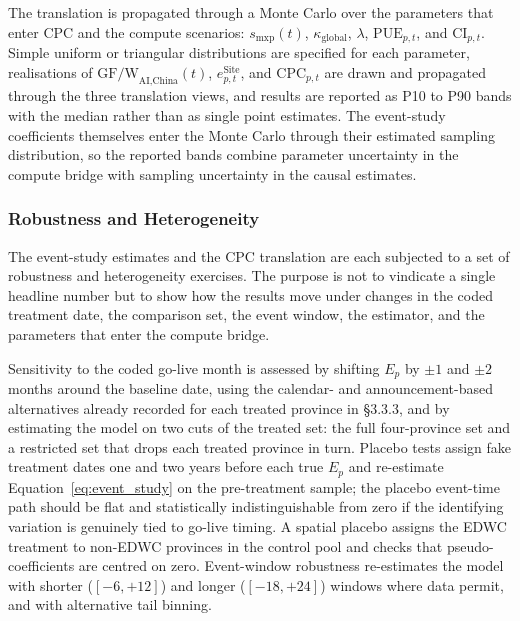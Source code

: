 \documentclass[12pt,a4paper]{article}
\begin{document}
The translation is propagated through a Monte Carlo over the
parameters that enter CPC and the compute scenarios:
$s_{\text{mxp}}(t)$, $\kappa_{\text{global}}$, $\lambda$,
$\text{PUE}_{p,t}$, and $\text{CI}_{p,t}$. Simple uniform or
triangular distributions are specified for each parameter,
realisations of $\text{GF/W}_{\text{AI,China}}(t)$,
$e^{\text{Site}}_{p,t}$, and $\text{CPC}_{p,t}$ are drawn and
propagated through the three translation views, and results are
reported as P10 to P90 bands with the median rather than as single
point estimates. The event-study coefficients themselves enter the
Monte Carlo through their estimated sampling distribution, so the
reported bands combine parameter uncertainty in the compute bridge
with sampling uncertainty in the causal estimates.

\subsubsection{Robustness and Heterogeneity}
%
%

The event-study estimates and the CPC translation are each subjected
to a set of robustness and heterogeneity exercises. The purpose is not
to vindicate a single headline number but to show how the results move
under changes in the coded treatment date, the comparison set, the
event window, the estimator, and the parameters that enter the
compute bridge.

Sensitivity to the coded go-live month is assessed by shifting $E_p$
by $\pm 1$ and $\pm 2$ months around the baseline date, using the
calendar- and announcement-based alternatives already recorded for
each treated province in §3.3.3, and by estimating the model on two
cuts of the treated set: the full four-province set and a restricted
set that drops each treated province in turn. Placebo tests assign
fake treatment dates one and two years before each true $E_p$ and
re-estimate Equation~\eqref{eq:event_study} on the pre-treatment
sample; the placebo event-time path should be flat and statistically
indistinguishable from zero if the identifying variation is genuinely
tied to go-live timing. A spatial placebo assigns the EDWC treatment
to non-EDWC provinces in the control pool and checks that
pseudo-coefficients are centred on zero. Event-window robustness
re-estimates the model with shorter ($[-6, +12]$) and longer
($[-18, +24]$) windows where data permit, and with alternative tail
binning.
\end{document}
